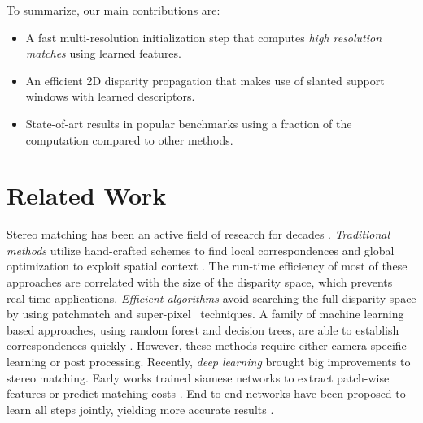 \documentclass[final]{cvpr}
\begin{document}
To summarize, our main contributions are:
\begin{itemize}
    \item A fast multi-resolution initialization step that computes \textit{high resolution matches} using learned features.
    \item An efficient 2D disparity propagation that makes use of slanted support windows with learned descriptors.
    \item State-of-art results in popular benchmarks using a fraction of the computation compared to other methods.
\end{itemize} \section{Related Work}

Stereo matching has been an active field of research for decades \cite{marr1976cooperative,scharstein2002taxonomy,hamzah2016literature}.
\textit{Traditional methods} utilize hand-crafted schemes to find local correspondences \cite{yoon2005locally,hosni2013fast,bleyer2008simple,hirschmuller2008stereo} and global optimization to exploit spatial context \cite{felzenszwalb2006efficient,klaus2006segment,kolmogorov2001computing}.
The run-time efficiency of most of these approaches are correlated with the size of the disparity space, which prevents real-time applications.
\textit{Efficient algorithms} \cite{li2015spm,lu2013patch,bleyer2011patchmatch,besse2014pmbp} avoid searching the full disparity space by using patchmatch \cite{barnes2009patchmatch} and {super-pixel~\cite{li2015spm}} techniques.
A family of machine learning based approaches, using random forest and decision trees, are able to establish correspondences quickly \cite{fanello14a,hyperdepth,fanello17_hashmatch,fanello2017ultrastereo}. However, these methods require either camera specific learning or post processing.
Recently, \textit{deep learning} brought big improvements to stereo matching. Early works trained siamese networks to extract patch-wise features or predict matching costs \cite{luo2016efficient,zbontar2016stereo,zagoruyko2015learning,zbontar2015computing}. 
End-to-end networks have been proposed to learn all steps jointly, yielding more accurate results \cite{shaked2017improved,mayer2016large,ranjan2017optical,song2020adastereo}. 
\end{document}
